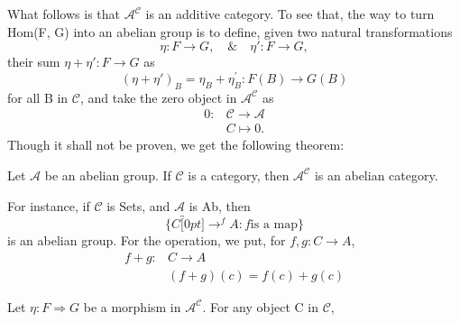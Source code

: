 \documentclass[../category_theory.tex]{subfiles}
\begin{document}
\begin{center}
\end{center}
What follows is that \(\mathcal{A}^{\mathcal{C}}\) is an additive category. To see that, the way to turn Hom(F, G) into an abelian group is to define, given two natural transformations
\[
	\eta :F\rightarrow G,\quad\&\quad \eta':F\rightarrow G,
\]
their sum \(\eta+\eta':F\rightarrow G\) as
\[
	(\eta +\eta ')_{B}=\eta_{B}+\eta_{B}^{'}:F(B)\rightarrow G(B)
\]
for all B in \(\mathcal{C}\), and take the zero object in \(\mathcal{A}^{\mathcal{C}}\) as
\begin{align*}
	0: & \mathcal{C}\longrightarrow \mathcal{A} \\
	   & C\longmapsto 0.
\end{align*}
Though it shall not be proven, we get the following theorem:
\begin{theorem*}
	Let \(\mathcal{A}\) be an abelian group. If \(\mathcal{C}\) is a category, then \(\mathcal{A}^{\mathcal{C}}\) is an abelian category.
\end{theorem*}
\begin{example}
	For instance, if \(\mathcal{C}\) is Sets, and \(\mathcal{A}\) is Ab, then
	\[
		\{C\overbracket[0pt]{\rightarrow}^{f}A: f\text{is a map}\}
	\]
	is an abelian group. For the operation, we put, for \(f, g:C\rightarrow A\),
	\begin{align*}
		f+g: & C\rightarrow A     \\
		     & (f+g)(c)=f(c)+g(c)
	\end{align*}
\end{example}
Let \(\eta :F\Rightarrow G \) be a morphism in \(\mathcal{A}^{\mathcal{C}}.\) For any object C in \(\mathcal{C}\),
\end{document}
